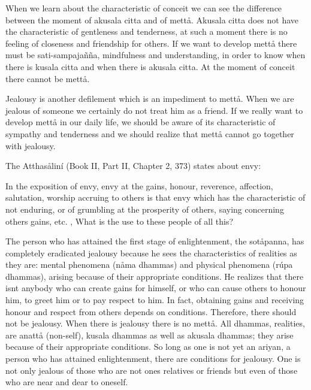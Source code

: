 \documentclass[12pt,twoside]{article}
\begin{document}
\bigskip

When we learn about the characteristic of conceit we can see the
difference between the moment of akusala citta and of mett{\aa}.
Akusala citta does not have the characteristic of gentleness and
tenderness, at such a moment there is no feeling of closeness and
friendship for others. If we want to develop mett{\aa} there must be
{\textasciigrave}{\textasciigrave}sati{}-sampaja\~n\~na{\textquotesingle}{\textquotesingle},
mindfulness and understanding, in order to know when there is kusala
citta and when there is akusala citta. At the moment of conceit there
cannot be mett{\aa}. 

Jealousy is another defilement which is an impediment to mett{\aa}. When
we are jealous of someone we certainly do not treat him as a friend. If
we really want to develop mett{\aa} in our daily life, we should be
aware of its characteristic of sympathy and tenderness and we should
realize that mett{\aa} cannot go together with jealousy. 

The Atthas{\aa}lin\'i (Book II, Part II, Chapter 2, 373) states about
envy:


\bigskip

In the exposition of envy, {\textasciigrave}{\textasciigrave}envy at the
gains, honour, reverence, affection, salutation, worship accruing to
others{\textquotesingle}{\textquotesingle} is that envy which has the
characteristic of not enduring, or of grumbling at the prosperity of
others, saying concerning others{\textquotesingle} gains, etc. ,
{\textasciigrave}{\textasciigrave}What is the use to these people of
all this?{\textquotesingle}{\textquotesingle}


\bigskip

The person who has attained the first stage of enlightenment, the
sot{\aa}panna, has completely eradicated jealousy because he sees the
characteristics of realities as they are: mental phenomena (n{\aa}ma
dhammas) and physical phenomena (r\'upa dhammas), arising because of
their appropriate conditions. He realizes that there
isn{\textquotesingle}t anybody who can create gains for himself, or who
can cause others to honour him, to greet him or to pay respect to him.
In fact, obtaining gains and receiving honour and respect from others
depends on conditions. Therefore, there should not be jealousy. When
there is jealousy there is no mett{\aa}. All dhammas, realities, are
anatt{\aa} (non{}-self), kusala dhammas as well as akusala dhammas;
they arise because of their appropriate conditions. So long as one is
not yet an
{\textasciigrave}{\textasciigrave}ariyan{\textquotesingle}{\textquotesingle},
a person who has attained enlightenment, there are conditions for
jealousy. One is not only jealous of those who are not
one{\textquotesingle}s relatives or friends but even of those who are
near and dear to oneself. 
\end{document}
